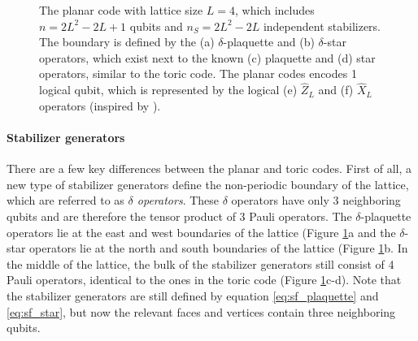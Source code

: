 \begin{figure}
  \centering
  \caption{The planar code with lattice size $L=4$, which includes $n = 2L^2-2L+1$ qubits and $n_S = 2L^2-2L$ independent stabilizers. The boundary is defined by the (a) $\delta$-plaquette and (b) $\delta$-star operators, which exist next to the known (c) plaquette and (d) star operators, similar to the toric code. The planar codes encodes 1 logical qubit, which is represented by the logical (e) $\hat{Z}_L$ and (f) $\hat{X}_L$ operators (inspired by \cite{browne}).}\label{sf:fig_planar}
\end{figure}

\paragraph{Stabilizer generators}
There are a few key differences between the planar and toric codes. First of all, a new type of stabilizer generators define the non-periodic boundary of the lattice, which are referred to as \emph{$\delta$ operators}. These $\delta$ operators have only 3 neighboring qubits and are therefore the tensor product of 3 Pauli operators. The $\delta$-plaquette operators lie at the east and west boundaries of the lattice (Figure \ref{sf:fig_planar}a and the $\delta$-star operators lie at the north and south boundaries of the lattice (Figure \ref{sf:fig_planar}b. In the middle of the lattice, the bulk of the stabilizer generators still consist of 4 Pauli operators, identical to the ones in the toric code (Figure \ref{sf:fig_planar}c-d). Note that the stabilizer generators are still defined by equation \eqref{eq:sf_plaquette} and \eqref{eq:sf_star}, but now the relevant faces and vertices contain three neighboring qubits.

